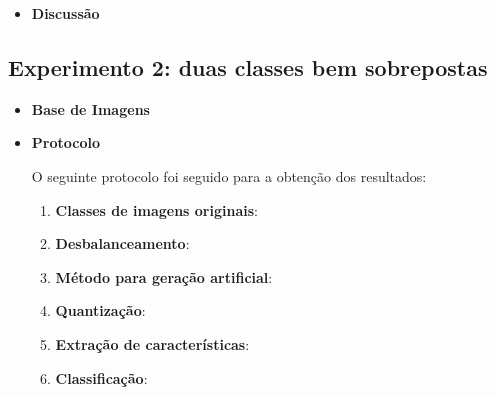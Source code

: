 \begin{itemize}
\item[] \textbf{Discussão}

\end{itemize}


\FloatBarrier
\subsection{Experimento 2: duas classes bem sobrepostas}

\begin{itemize}
\item[] \textbf{Base de Imagens}


\item[] \textbf{Protocolo}

O seguinte protocolo foi seguido para a obtenção dos resultados:

\begin{enumerate}
\item \textbf{Classes de imagens originais}:
\item \textbf{Desbalanceamento}:
\item \textbf{Método para geração artificial}:
\item \textbf{Quantização}:
\item \textbf{Extração de características}:
\item \textbf{Classificação}:
\end{enumerate}


\end{itemize}
